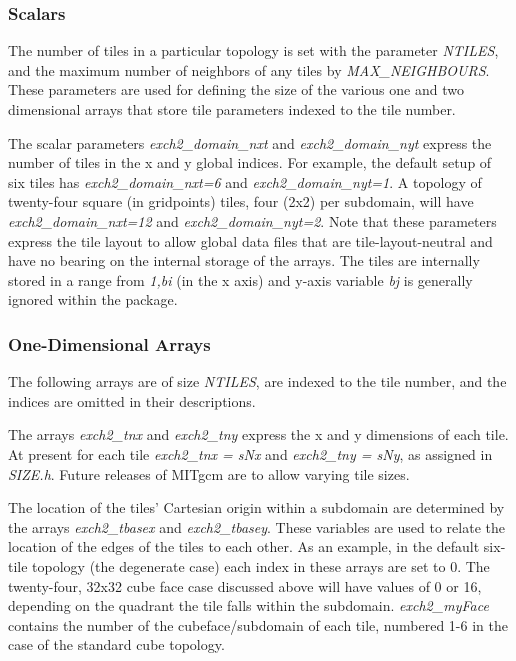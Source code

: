 \subsubsection{Scalars}

The number of tiles in a particular topology is set with the parameter
{\em NTILES}, and the maximum number of neighbors of any tiles by 
{\em MAX\_NEIGHBOURS}.  These parameters are used for defining the size of
the various one and two dimensional arrays that store tile parameters
indexed to the tile number.

The scalar parameters {\em exch2\_domain\_nxt} and 
{\em exch2\_domain\_nyt} express the number of tiles in the x and y global
indices.  For example, the default setup of six tiles has 
{\em exch2\_domain\_nxt=6} and {\em exch2\_domain\_nyt=1}.  A topology of
twenty-four square (in gridpoints) tiles, four (2x2) per subdomain, will
have {\em exch2\_domain\_nxt=12} and {\em exch2\_domain\_nyt=2}.  Note 
that these parameters express the tile layout to allow global data files that
are tile-layout-neutral and have no bearing on the internal storage of the
arrays.  The tiles are internally stored in a range from {\em 1,bi} (in the
x axis) and y-axis variable {\em bj} is generally ignored within the package.

\subsubsection{One-Dimensional Arrays}

The following arrays are of size {\em NTILES}, are indexed to the tile number, 
and the indices are omitted in their descriptions.

The arrays {\em exch2\_tnx} and {\em exch2\_tny} 
express the x and y dimensions of each tile.  At present for each tile
{\em exch2\_tnx = sNx} 
and {\em exch2\_tny = sNy}, as assigned in {\em SIZE.h}.  Future releases of 
MITgcm are to allow varying tile sizes.

The location of the tiles' Cartesian origin within a subdomain are determined 
by the arrays {\em exch2\_tbasex} and {\em exch2\_tbasey}.  These variables
are used to relate the location of the edges of the tiles to each other.  As 
an example, in the default six-tile topology (the degenerate case) 
each index in these arrays are 
set to 0.  The twenty-four, 32x32 cube face case discussed above will have
values of 0 or 16, depending on the quadrant the tile falls within the 
subdomain.  {\em exch2\_myFace} contains the number of the 
cubeface/subdomain of each tile, numbered 1-6 in the case of the standard
cube topology.  

